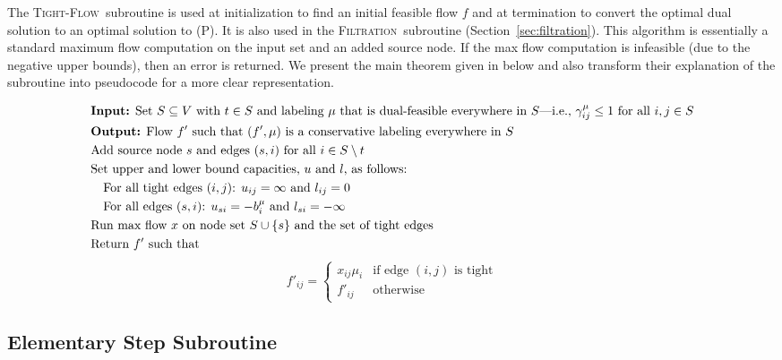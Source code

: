 \documentclass[11pt]{article}
\newtheorem{theorem}{Theorem}[section]
\theoremstyle{definition}
\theoremstyle{definition}
\newcommand{\biu}{b_{i}^{\mu}}
\newcommand{\giij}{\gamma_{ij}^{\mu}}
\newcommand{\tf}{\textsc{Tight-Flow}}
\newcommand{\filtration}{\textsc{Filtration}}
\newcommand{\todo}[1]{}%
\begin{document}
	The \tf\ subroutine is used at initialization to find an initial feasible flow $f$ and at
    termination to convert the optimal dual solution to an optimal solution to (P).
    It is also used in the \filtration\ subroutine (Section~\ref{sec:filtration}).
    This algorithm is essentially a standard maximum flow computation on the input
    set and an added source node. If the max flow computation is infeasible (due to the
    negative upper bounds), then an error is returned. We present the main theorem
    given in \cite{Vegh2013} below and also transform their explanation of the
    subroutine into pseudocode for a more clear representation.
	\todo{proof?}

	\begin{align*}
	&\text{\textbf{Input:} Set $S \subseteq V$ with $t \in S$ and labeling $\mu$ that is
           dual-feasible everywhere in $S$---i.e., $\giij \leq 1$ for all $i, j \in S$} \\
	&\text{\textbf{Output:} Flow $f'$ such that $(f', \mu)$ is a conservative labeling
           everywhere in $S$} \\
	&\text{Add source node $s$ and edges $(s, i)$ for all $i \in S \setminus t$} \\
	&\text{Set upper and lower bound capacities, $u$ and $l$, as follows: } \\
	&\quad \text{For all tight edges $(i, j)$: $u_{ij} = \infty$ and $l_{ij} = 0$} \\
	&\quad \text{For all edges $(s, i)$: $u_{si} = -\biu$ and $l_{si} = -\infty$} \\
	&\text{Run max flow $x$ on node set $S \cup \{s\}$ and the set of tight edges} \\
	&\text{Return $f'$ such that}
    \end{align*}
    \[ f'_{ij} = \begin{cases} x_{ij} \mu_i & \text{if edge } (i, j) \text{ is tight} \\
    					       f'_{ij}      & \text{otherwise}
                 \end{cases}
    \]
	
	\subsection{Elementary Step Subroutine}\label{sec:es}
    
\end{document}
